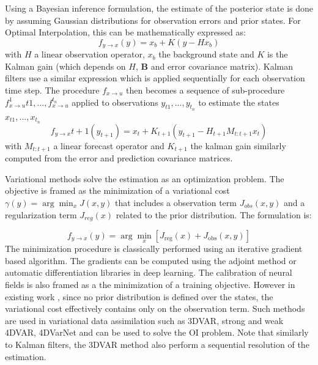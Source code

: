 \begin{bibunit}
Using a Bayesian inference formulation, the estimate of the posterior state is done by assuming Gaussian distributions for observation errors and prior states. 
For Optimal Interpolation, this can be mathematically expressed as:
  \begin{equation}
 f_{y\to x}(y)= x_b + K(y - Hx_b)
    \label{eq:KalmanOI}
  \end{equation}
with $H$ a linear observation operator, $x_b$ the background state  and $K$ is the Kalman gain (which depends on $H$, $\mathbf{B}$ and error covariance matrix).
Kalman filters use a similar expression which is applied sequentially for each observation time step.
The procedure $f_{x\to u}$ then becomes a sequence of sub-procedure $f_{x\to u}^1{t1}, ..., f_{x\to u}^{t_n}$ applied to observations $y_{t1}, ..., y_{t_n}$ to estimate the states $x_{t1}, ..., x_{t_n}$ 
  \begin{equation}
f_{y\to x}{t+1}(y_{t+1})= x_{t} + K_{t+1}(y_{t+1} - H_{t+1}M_{t:t+1}x_{t})
    \label{eq:KalmanKF}
  \end{equation}
 with $M_{t:t+1}$ a linear forecast operator and $K_{t+1}$ the kalman gain similarly computed from the error and prediction covariance matrices. 


Variational methods solve the estimation as an optimization problem. The objective is framed as the minimization of a variational cost $\gamma(y) = \arg\min_x J(x, y)$ that includes a observation term $J_{obs}(x, y)$ and a regularization term  $J_{reg}(x)$ related to the prior distribution. The formulation is:

  \begin{equation}
 f_{y\to x}(y) = \arg\min_x \left[ J_{\text{reg}}(x) + J_{\text{obs}}(x, y) \right]
    \label{eq:VarDa}
  \end{equation}
The minimization procedure is classically performed using an iterative gradient based algorithm\cite{carrassiDataAssimilationGeosciences2018}. The gradients can be computed using the adjoint method\cite{lelloucheCopernicusGlobal122021} or automatic differentiation libraries in deep learning\cite{fabletENDTOENDPHYSICSINFORMEDREPRESENTATION2021}.
The calibration of neural fields is also framed as a the minimization of a training objective. However in existing work \cite{johnsonNeuralFieldsFast2022}, since no prior distribution is defined over the states, the variational cost effectively contains only on the observation term.
Such methods are used in variational data assimilation such as 3DVAR, strong and weak 4DVAR, 4DVarNet and can be used to solve the OI problem. Note that similarly to Kalman filters, the 3DVAR method also perform a sequential resolution of the estimation.



\end{bibunit}
